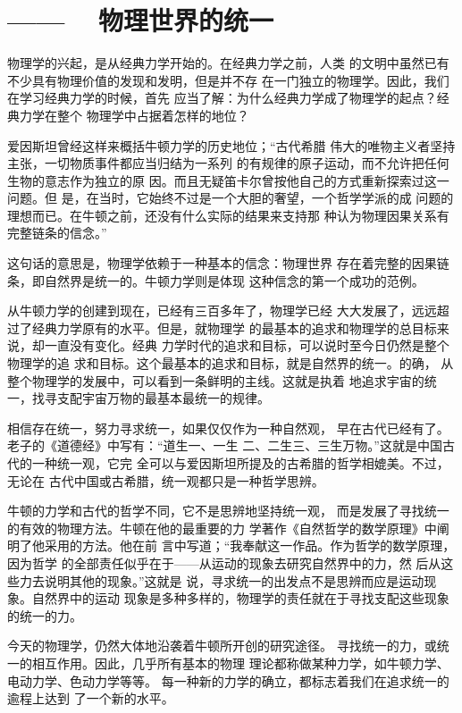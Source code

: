 \chapter[物理世界的统一]{—— ~ 物理世界的统一}\label{chp:0}

物理学的兴起，是从经典力学开始的。在经典力学之前，人类
的文明中虽然已有不少具有物理价值的发现和发明，但是并不存
在一门独立的物理学。因此，我们在学习经典力学的时候，首先
应当了解：为什么经典力学成了物理学的起点？经典力学在整个
物理学中占据着怎样的地位？

爱因斯坦曾经这样来概括牛顿力学的历史地位；“古代希腊
伟大的唯物主义者坚持主张，一切物质事件都应当归结为一系列
的有规律的原子运动，而不允许把任何生物的意志作为独立的原
因。而且无疑笛卡尔曾按他自己的方式重新探索过这一问题。但
是，在当时，它始终不过是一个大胆的奢望，一个哲学学派的成
问题的理想而已。在牛顿之前，还没有什么实际的结果来支持那
种认为物理因果关系有完整链条的信念。”

这句话的意思是，物理学依赖于一种基本的信念：物理世界
存在着完整的因果链条，即自然界是统一的。牛顿力学则是体现
这种信念的第一个成功的范例。

从牛顿力学的创建到现在，已经有三百多年了，物理学已经
大大发展了，远远超过了经典力学原有的水平。但是，就物理学
的最基本的追求和物理学的总目标来说，却一直没有变化。经典
力学时代的追求和目标，可以说时至今日仍然是整个物理学的追
求和目标。这个最基本的追求和目标，就是自然界的统一。的确，
从整个物理学的发展中，可以看到一条鲜明的主线。这就是执着%
地追求宇宙的统一，找寻支配宇宙万物的最基本最统一的规律。

相信存在统一，努力寻求统一，如果仅仅作为一种自然观，
早在古代已经有了。老子的《道德经》中写有：“道生一、一生
二、二生三、三生万物。”这就是中国古代的一种统一观，它完
全可以与爱因斯坦所提及的古希腊的哲学相媲美。不过，无论在
古代中国或古希腊，统一观都只是一种哲学思辨。

牛顿的力学和古代的哲学不同，它不是思辨地坚持统一观，
而是发展了寻找统一的有效的物理方法。牛顿在他的最重要的力
学著作《自然哲学的数学原理》中阐明了他采用的方法。他在前
言中写道；“我奉献这一作品。作为哲学的数学原理，因为哲学
的全部责任似乎在于——从运动的现象去研究自然界中的力，然
后从这些力去说明其他的现象。”这就是
说，寻求统一的出发点不是思辨而应是运动现象。自然界中的运动
现象是多种多样的，物理学的责任就在于寻找支配这些现象的统一的力。

今天的物理学，仍然大体地沿袭着牛顿所开创的研究途径。
寻找统一的力，或统一的相互作用。因此，几乎所有基本的物理
理论都称做某种力学，如牛顿力学、电动力学、色动力学等等。
每一种新的力学的确立，都标志着我们在追求统一的逾程上达到
了一个新的水平。

